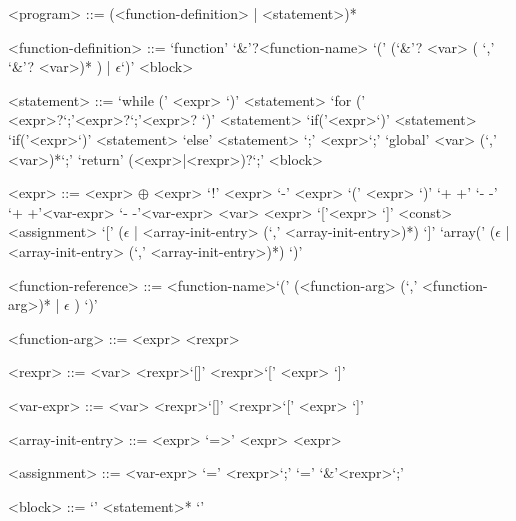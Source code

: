 \begin{grammar}
<program> ::= (<function-definition> | <statement>)*
\end{grammar}
\begin{grammar}
<function-definition> ::= `function' `&'?<function-name> `(' (`&'? <var> ( `,' `&'? <var>)* ) | $\epsilon$`)' <block>
\end{grammar}
\begin{grammar}
<statement> ::= `while (' <expr> `)' <statement>
\alt `for (' <expr>?`;'<expr>?`;'<expr>? `)' <statement>
\alt `if('<expr>`)' <statement>
\alt `if('<expr>`)' <statement> `else' <statement>
\alt `;'
\alt <expr>`;'
\alt `global' <var> (`,' <var>)*`;'
\alt `return' (<expr>|<rexpr>)?`;'
\alt <block>
\end{grammar}
\begin{grammar}
<expr> ::= <expr> $\oplus$ <expr>
\alt `!' <expr>
\alt `-' <expr>
\alt `(' <expr> `)'
`+ +'
`- -'
\alt `+ +'<var-expr>
\alt `- -'<var-expr>
\alt <var>
\alt <expr> `['<expr> `]'
\alt <const>
\alt <assignment>
\alt `[' ($\epsilon$ | <array-init-entry> (`,' <array-init-entry>)*) `]'
\alt `array(' ($\epsilon$ | <array-init-entry> (`,' <array-init-entry>)*) `)'
\end{grammar}
\begin{grammar}
<function-reference> ::= <function-name>`(' (<function-arg> (`,' <function-arg>)* | $\epsilon$ ) `)'
\end{grammar}
\begin{grammar}
<function-arg> ::= <expr> 
\alt <rexpr> 
\end{grammar}
\begin{grammar}
<rexpr> ::= <var> 
\alt <rexpr>`[]'
\alt <rexpr>`[' <expr> `]'
\end{grammar}
\begin{grammar}
<var-expr> ::= <var> 
\alt <rexpr>`[]'
\alt <rexpr>`[' <expr> `]'
\end{grammar}
\begin{grammar}
<array-init-entry> ::= <expr> `=>' <expr> 
\alt <expr>
\end{grammar}
\begin{grammar}
<assignment> ::= <var-expr> `=' <rexpr>`;'
 `=' `&'<rexpr>`;'
\end{grammar}
\begin{grammar}
<block> ::= `{' <statement>* `}'
\end{grammar}